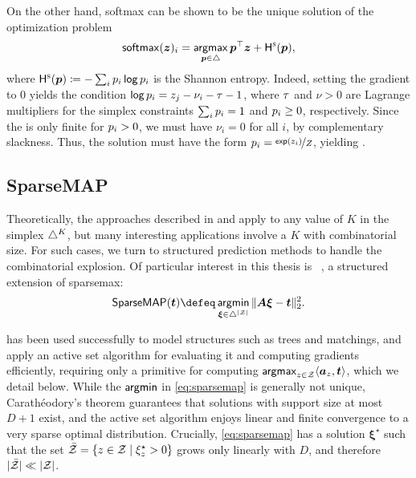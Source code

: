 On the other hand, softmax can be shown to be the unique solution of the optimization problem
\begin{equation}
    \operatorname*{\mathsf{softmax}}(\bm{z})_i =
    \operatorname*{\mathsf{argmax}}_{\bm{p} \in \triangle} \bm{p}^\top\bm{z} + \mathsf{H}^{\textsc{s}}(\bm{p}),
\end{equation}
where $\mathsf{H}^{\textsc{s}}(\bm{p}) \coloneqq -\sum_i p_i \operatorname*{\mathsf{log}} p_i$ is the Shannon entropy.
Indeed, setting the gradient to $0$ yields the condition
$\operatorname*{\mathsf{log}} p_i = z_j - \nu_i - \tau - 1$, where $\tau$ and $\nu > 0$ are Lagrange
multipliers for the simplex constraints $\sum_i p_i = 1$ and $p_i \geq 0$,
respectively. Since the \lhs is only finite for $p_i>0$,
we must have $\nu_i=0$ for all $i$, by complementary
slackness. Thus, the solution must have the form $p_i =
    \nicefrac{\operatorname*{\mathsf{exp}}(z_i)}{Z}$, yielding .

\subsection{SparseMAP}\label{sec:smap_bg}

\noindent Theoretically, the approaches described in 
and  apply to any value of $K$ in the simplex $\triangle^K$, but many
interesting applications involve a $K$ with
combinatorial size. For such cases, we turn to structured prediction
methods to handle the combinatorial explosion. Of particular
interest in this thesis is \smap~\citep{niculae2018sparsemap,
    sparsemapcg}, a structured extension of sparsemax:
%
\begin{equation}\label{eq:sparsemap}
    \smapop(\bm{t}) \defeq \argmin_{\pv \in \simplex^{|\ZZ|}}
    \|\bm{A}\pv - \bm{t}\|_2^2.
\end{equation}

\smap has been used successfully to model structures such as trees
and matchings, and \citet{niculae2018sparsemap} apply an active set
algorithm for evaluating it and computing gradients efficiently,
requiring only a primitive for computing $\operatorname*{\mathsf{argmax}}_{z \in \mathcal{Z}} \langle
    \bm{a}_z, \bm{t}\rangle$, which we detail below. While the
$\operatorname*{\mathsf{argmin}}$ in \eqref{eq:sparsemap} is generally not unique,
Carath\'eodory's theorem guarantees that solutions with support size
at most $D+1$ exist, and the active set algorithm enjoys linear and
finite convergence to a very sparse optimal distribution. Crucially,
\eqref{eq:sparsemap} has a solution $\bm{\xi}^\star$ such that the
set $\bar{\mathcal{Z}} = \left\{z \in \mathcal{Z} \mid \xi^\star_z > 0\right\}$ grows
only linearly with $D$, and therefore $|\bar{\mathcal{Z}}| \ll |\mathcal{Z}|$.

